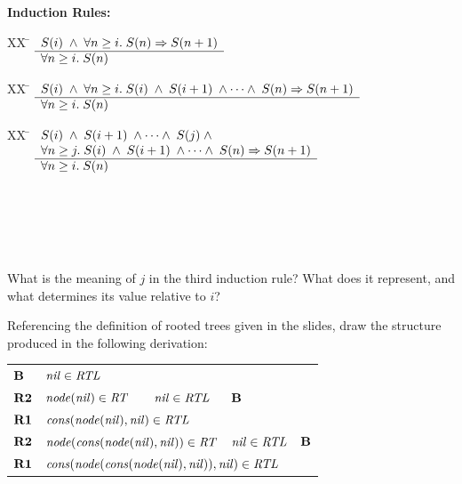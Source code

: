 \documentclass[]{exam}
\theoremstyle{definition}
\newcommand{\id}[1]{\mbox{\it #1\/}}
\newcommand{\bid}[1]{\mbox{\bf #1}}
\begin{document}
\begin{questions}
\begin{multicols}{2}
\columnbreak
{\bf Induction Rules:}\\
\begin{tabbing}
[1]XX \=  \kill
[1] \>
	\(\begin{array}[t]{l}
	S(i) \;\wedge\; \forall n \geq i.\;S(n) \Rightarrow S(n+1) \\
	\hline
	\forall n \geq i. \; S(n)
	\end{array}\) %
\end{tabbing}

\begin{tabbing}
[2]XX \=  \kill
[2] \>
	\(\begin{array}[t]{l}
	S(i) \;\wedge\; \forall n \geq i.\;S(i)\;\wedge\;S(i+1)\;\wedge\cdots\wedge\;S(n) \Rightarrow S(n+1) \\
	\hline
	\forall n \geq i. \; S(n)
	\end{array}\)
\end{tabbing}

\begin{tabbing}
[3]XX \=  \kill
[3] \>
	\(\begin{array}[t]{l}
	S(i) \;\wedge\; S(i+1)\;\wedge\cdots\wedge\;S(j)\;\wedge\; \\
\forall n \geq j.\;S(i)\;\wedge\;S(i+1)\;\wedge\cdots\wedge\;S(n) \Rightarrow S(n+1) \\
	\hline
	\forall n \geq i. \; S(n)
	\end{array}\) %
\end{tabbing}
~\\
~\\
~\\
~\\
    
\end{multicols}

\question What is the meaning of $j$ in the third induction rule? What does it
represent, and what determines its value relative to $i$?

\question Referencing the definition of rooted trees given in the slides,
draw the structure produced in the following derivation:

\begin{center}
\begin{tabular}{lllll}
  $\bid{B}$  & $\id{nil}\in\id{RTL}$            &                       & &
  \\ \cline{2-2} 
  $\bid{R2}$ & $\id{node}(\id{nil})\in\id{RT}$  & $\id{nil}\in\id{RTL}$ & $\bid{B}$ &
  \\ \cline{2-3}
  $\bid{R1}$ & \multicolumn{2}{l}{ $\id{cons}(\id{node}(\id{nil}),\id{nil})\in\id{RTL}$} & & 
  \\ \cline{2-3}
  $\bid{R2}$ & \multicolumn{2}{l}{ $\id{node}(\id{cons}(\id{node}(\id{nil}),\id{nil}))\in\id{RT}$} & $\id{nil} \in \id{RTL}$ & $\bid{B}$
  \\ \cline{2-4}
  $\bid{R1}$ &
  \multicolumn{3}{l}{$\id{cons}(\id{node}(\id{cons}(\id{node}(\id{nil}),\id{nil})), \id{nil})\in\id{RTL}$}
\end{tabular}
\end{center}


\end{questions}
\end{document}
